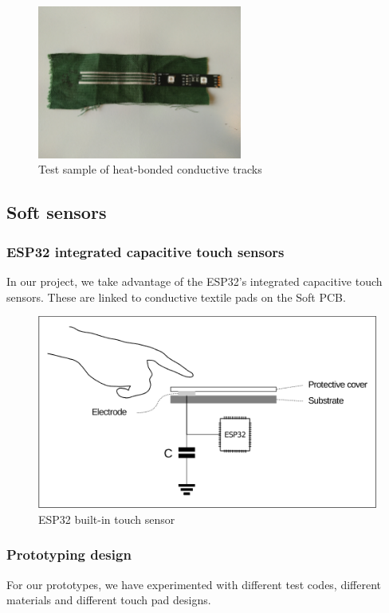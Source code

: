 \begin{figure}[ht]
    \centering
    \includegraphics[width=0.6\textwidth]{images/HW/heatbond_tracks.jpg}
    \caption{Test sample of heat-bonded conductive tracks}
    \label{fig:heat_tracks}
\end{figure}

\subsection{Soft sensors}
    \subsubsection{ESP32 integrated capacitive touch sensors}
In our project, we take advantage of the ESP32's integrated capacitive touch sensors. These are linked to conductive textile pads on the Soft PCB. 

\begin{figure}[ht]
    \centering
    \includegraphics[scale=0.5]{images/FW/esp_touchsensor.PNG}
    \caption{ESP32 built-in touch sensor}
    \label{fig:esp_touchsens}
\end{figure}

    \subsubsection{Prototyping design}
For our prototypes, we have experimented with different test codes, different materials and different touch pad designs.

